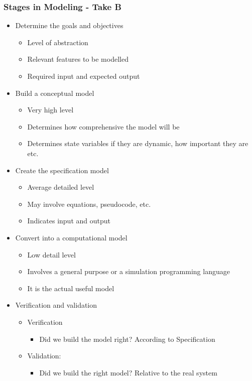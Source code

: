 \subsubsection{Stages in Modeling - Take B}
\begin{itemize}
	\item Determine the goals and objectives
	\begin{itemize}
		\item Level of abstraction
		\item Relevant features to be modelled
		\item Required input and expected output
	\end{itemize}
	\item Build a conceptual model
	\begin{itemize}
		\item Very high level
		\item Determines how comprehensive the model will be
		\item Determines state variables if they are dynamic,
			how important they are etc.
	\end{itemize}
	\item Create the specification model
	\begin{itemize}
		\item Average detailed level
		\item May involve equations, pseudocode, etc.
		\item Indicates input and output
	\end{itemize}
	\item Convert into a computational model
	\begin{itemize}
		\item Low detail level
		\item Involves a general purpose or a simulation
			programming language
		\item It is the actual useful model
	\end{itemize}
	\item Verification and validation
	\begin{itemize}
		\item Verification
		\begin{itemize}
			\item Did we build the model right? According to
				Specification
		\end{itemize}
		\item Validation:
		\begin{itemize}
			\item Did we build the right model? Relative to
				the real system
		\end{itemize}
	\end{itemize}
\end{itemize}

